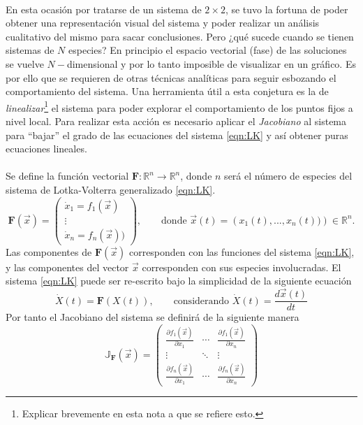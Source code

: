 \\
En esta ocasión por tratarse de un sistema de $2\times 2$, se tuvo la fortuna de poder obtener una representación visual del sistema y poder realizar un análisis cualitativo del mismo para sacar conclusiones. Pero ¿qué sucede cuando se tienen sistemas de $N$ especies? En principio el espacio vectorial (fase) de las soluciones se vuelve $N-$dimensional y por lo tanto imposible de visualizar en un gráfico. Es por ello que se requieren de otras técnicas analíticas para seguir esbozando el comportamiento del sistema. Una herramienta útil a esta conjetura es la de \textit{linealizar}\footnote{Explicar brevemente en esta nota a que se refiere esto.} el sistema para poder explorar el comportamiento de los puntos fijos a nivel local. Para realizar esta acción es necesario aplicar el \textit{Jacobiano} al sistema para ``bajar'' el grado de las ecuaciones del sistema \ref{eqn:LK} y así obtener puras ecuaciones lineales.\\
\\
Se define la función vectorial $\mathbf{F}:\mathbb{R}^n\to\mathbb{R}^n$, donde $n$ será el número de especies del sistema de Lotka-Volterra generalizado \ref{eqn:LK}.
\begin{equation}\label{eqn:Fmatricial}
	\mathbf{F}(\vec{x})=\begin{pmatrix}
		\dot{x}_1=f_1(\vec{x})\\
		\vdots\\
		\dot{x}_n=f_n(\vec{x}))
	\end{pmatrix},\qquad\text{donde $\vec{x}(t)=\left(x_1(t),...,x_n(t))\right)\in\mathbb{R}^n$.}
\end{equation}
Las componentes de $\mathbf{F}(\vec{x})$ corresponden con las funciones del sistema \ref{eqn:LK}, y las componentes del vector $\vec{x}$ corresponden con sus especies involucradas. El sistema \ref{eqn:LK} puede ser re-escrito bajo la simplicidad de la siguiente ecuación
\begin{equation}\label{eqn:LKmatricial}
	\dot{X}(t) = \mathbf{F}(X(t)),\qquad\text{considerando $\dot{X}(t)=\frac{d\vec{x}(t)}{dt}$}
\end{equation}
Por tanto el Jacobiano del sistema se definirá de la siguiente manera
\begin{equation}\label{eqn:Jacobiano}
	\mathbb{J}_\mathbf{F}(\vec{x}) = \begin{pmatrix}
		\frac{\partial f_1(\vec{x})}{\partial x_1} & \cdots &\frac{\partial f_1(\vec{x})}{\partial x_n}\\
		\vdots & \ddots & \vdots\\
		\frac{\partial f_n(\vec{x})}{\partial x_1} & \cdots &\frac{\partial f_n(\vec{x})}{\partial x_n}
	\end{pmatrix}
\end{equation}
